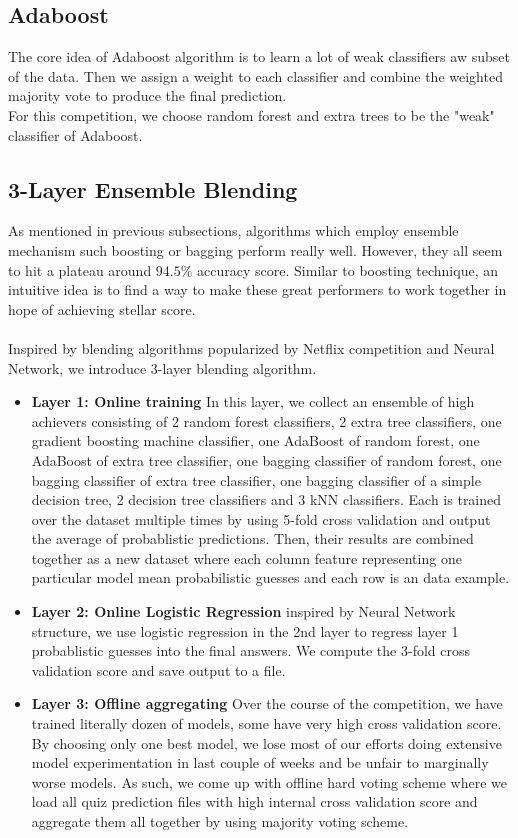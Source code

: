 \documentclass[conference]{IEEEtran}
\begin{document}
\subsection{Adaboost}
The core idea of Adaboost algorithm is to learn a lot of weak classifiers aw subset of the data. Then we assign a weight to each classifier and combine the weighted majority vote to produce the final prediction. \\
For this competition, we choose random forest and extra trees to be the "weak" classifier of Adaboost. 

\subsection{3-Layer Ensemble Blending}
As mentioned in previous subsections, algorithms which employ ensemble mechanism such boosting or bagging perform really well. However, they all seem to hit a plateau around $94.5\%$ accuracy score. Similar to boosting technique, an intuitive idea is to find a way to make these great performers to work together in hope of achieving stellar score. \\ \\
Inspired by blending algorithms popularized by Netflix competition and Neural Network, we introduce 3-layer blending algorithm.
\\
\begin{itemize}
\item \textbf{Layer 1: Online training} In this layer, we collect an ensemble of high achievers consisting of 2 random forest classifiers, 2 extra tree classifiers, one gradient boosting machine classifier, one AdaBoost of random forest, one AdaBoost of extra tree classifier, one bagging classifier of random forest, one bagging classifier of extra tree classifier, one bagging classifier of a simple decision tree, 2 decision tree classifiers and 3 kNN classifiers. Each is trained over the dataset multiple times by using 5-fold cross validation and output the average of probablistic predictions. Then, their results are combined together as a new dataset where each column feature representing one particular model mean probabilistic guesses and each row is an data example.
\item \textbf{Layer 2: Online Logistic Regression} inspired by Neural Network structure, we use logistic regression in the 2nd layer to regress layer 1 probablistic guesses into the final answers. We compute the 3-fold cross validation score and save output to a file.
\item \textbf{Layer 3: Offline aggregating} Over the course of the competition, we have trained literally dozen of models, some have very high cross validation score. By choosing only one best model, we lose most of our efforts doing extensive model experimentation in last couple of weeks and be unfair to marginally worse models. As such, we come up with offline hard voting scheme where we load all quiz prediction files with high internal cross validation score and aggregate them all together by using majority voting scheme.
\end{itemize}
\end{document}
